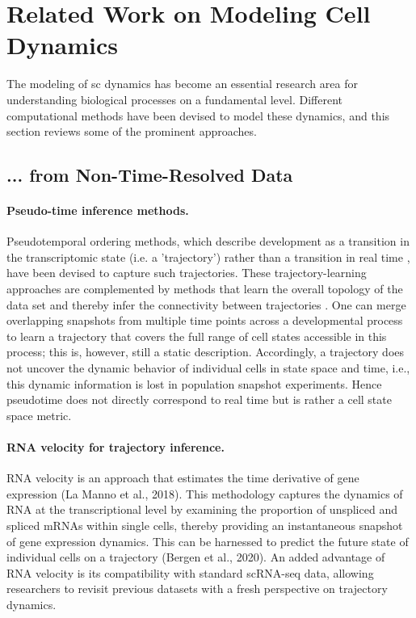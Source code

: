 \section{Related Work on Modeling Cell Dynamics}
\label{sec:related_work_bio}

The modeling of \acrlong{sc} dynamics has become an essential research area for understanding biological processes on a fundamental level. Different computational methods have been devised to model these dynamics, and this section reviews some of the prominent approaches.

\subsection*{... from Non-Time-Resolved Data}

\paragraph{Pseudo-time inference methods.}

Pseudotemporal ordering methods, which describe development as a transition in the transcriptomic state (i.e. a 'trajectory') rather than a transition in real time \citep{haghverdi2016diffusion, trapnell2014dynamics}, have been devised to capture such trajectories. These trajectory-learning approaches are complemented by methods that learn the overall topology of the data set and thereby infer the connectivity between trajectories \citep{qiu2017reversed, wolf2019paga, saelens2019comparison}. One can merge overlapping snapshots from multiple time points across a developmental process to learn a trajectory that covers the full range of cell states accessible in this process; this is, however, still a static description. Accordingly, a trajectory does not uncover the dynamic behavior of individual cells in state space and time, i.e., this dynamic information is lost in population snapshot experiments. Hence pseudotime does not directly correspond to real time but is rather a cell state space metric.

\paragraph{RNA velocity for trajectory inference.}

RNA velocity is an approach that estimates the time derivative of gene expression (La Manno et al., 2018). This methodology captures the dynamics of RNA at the transcriptional level by examining the proportion of unspliced and spliced mRNAs within single cells, thereby providing an instantaneous snapshot of gene expression dynamics. This can be harnessed to predict the future state of individual cells on a trajectory (Bergen et al., 2020). An added advantage of RNA velocity is its compatibility with standard scRNA-seq data, allowing researchers to revisit previous datasets with a fresh perspective on trajectory dynamics.



